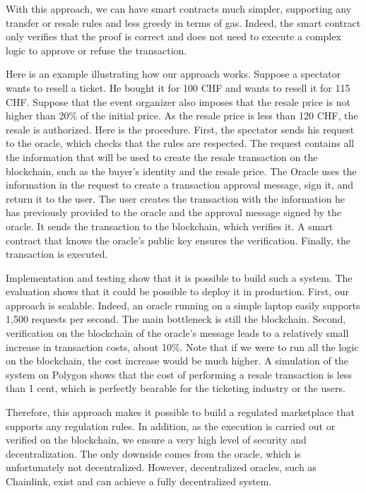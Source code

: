 \documentclass[a4paper,11pt,oneside]{report}
\begin{document}
With this approach, we can have smart contracts much simpler, supporting any transfer or resale rules and less greedy in terms of gas. Indeed, the smart contract only verifies that the proof is correct and does not need to execute a complex logic to approve or refuse the transaction.

Here is an example illustrating how our approach works. Suppose a spectator wants to resell a ticket. He bought it for 100 CHF and wants to resell it for 115 CHF. Suppose that the event organizer also imposes that the resale price is not higher than 20\% of the initial price. As the resale price is less than 120 CHF, the resale is authorized. Here is the procedure. First, the spectator sends his request to the oracle, which checks that the rules are respected. The request contains all the information that will be used to create the resale transaction on the blockchain, such as the buyer's identity and the resale price. The Oracle uses the information in the request to create a transaction approval message, sign it, and return it to the user. The user creates the transaction with the information he has previously provided to the oracle and the approval message signed by the oracle. It sends the transaction to the blockchain, which verifies it. A smart contract that knows the oracle's public key ensures the verification. Finally, the transaction is executed.

Implementation and testing show that it is possible to build such a system. The evaluation shows that it could be possible to deploy it in production. First, our approach is scalable. Indeed, an oracle running on a simple laptop easily supports 1,500 requests per second. The main bottleneck is still the blockchain. Second, verification on the blockchain of the oracle's message leads to a relatively small increase in transaction costs, about 10\%. Note that if we were to run all the logic on the blockchain, the cost increase would be much higher. A simulation of the system on Polygon shows that the cost of performing a resale transaction is less than 1 cent, which is perfectly bearable for the ticketing industry or the users.

Therefore, this approach makes it possible to build a regulated marketplace that supports any regulation rules. In addition, as the execution is carried out or verified on the blockchain, we ensure a very high level of security and decentralization. The only downside comes from the oracle, which is unfortunately not decentralized. However, decentralized oracles, such as Chainlink, exist and can achieve a fully decentralized system.
\end{document}

